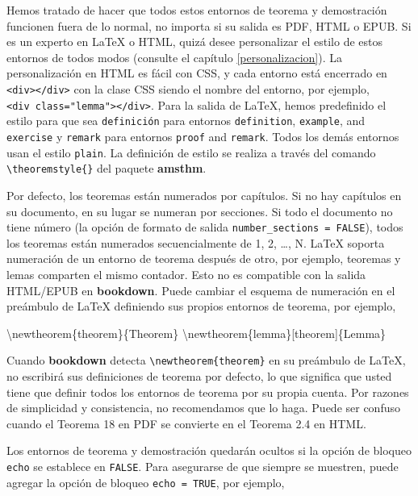 \documentclass[12pt,]{krantz}
\makeatletter
\newenvironment{Shaded}{\begin{snugshade}}{\end{snugshade}}
\newcommand{\FunctionTok}[1]{\textcolor[rgb]{0.00,0.00,0.00}{#1}}
\newcommand{\NormalTok}[1]{#1}
\newenvironment{kframe}{%
\medskip{}
\setlength{\fboxsep}{.8em}
 \def\at@end@of@kframe{}%
 \ifinner\ifhmode%
  \def\at@end@of@kframe{\end{minipage}}%
  \begin{minipage}{\columnwidth}%
 \fi\fi%
 \def\FrameCommand##1{\hskip\@totalleftmargin \hskip-\fboxsep
 \colorbox{shadecolor}{##1}\hskip-\fboxsep
     \hskip-\linewidth \hskip-\@totalleftmargin \hskip\columnwidth}%
 \MakeFramed {\advance\hsize-\width
   \@totalleftmargin\z@ \linewidth\hsize
   \@setminipage}}%
 {\par\unskip\endMakeFramed%
 \at@end@of@kframe}
\renewenvironment{Shaded}{\begin{kframe}}{\end{kframe}}
\theoremstyle{definition}
\theoremstyle{definition}
\theoremstyle{definition}
\theoremstyle{remark}
\makeatother
\begin{document}
Hemos tratado de hacer que todos estos entornos de teorema y
demostración funcionen fuera de lo normal, no importa si su salida es
PDF, HTML o EPUB. Si es un experto en LaTeX o HTML, quizá desee
personalizar el estilo de estos entornos de todos modos (consulte el
capítulo \ref{personalizacion}). La personalización en HTML es fácil con
CSS, y cada entorno está encerrado en
\texttt{\textless{}div\textgreater{}\textless{}/div\textgreater{}} con
la clase CSS siendo el nombre del entorno, por ejemplo,
\texttt{\textless{}div\ class="lemma"\textgreater{}\textless{}/div\textgreater{}}.
Para la salida de LaTeX, hemos predefinido el estilo para que sea
\texttt{definición} para entornos \texttt{definition}, \texttt{example},
and \texttt{exercise} y \texttt{remark} para entornos \texttt{proof} and
\texttt{remark}. Todos los demás entornos usan el estilo \texttt{plain}.
La definición de estilo se realiza a través del comando
\texttt{\textbackslash{}theoremstyle\{\}} del paquete \textbf{amsthm}.

Por defecto, los teoremas están numerados por capítulos. Si no hay
capítulos en su documento, en su lugar se numeran por secciones. Si todo
el documento no tiene número (la opción de formato de salida
\texttt{number\_sections\ =\ FALSE}), todos los teoremas están numerados
secuencialmente de 1, 2, \ldots{}, N. LaTeX soporta numeración de un
entorno de teorema después de otro, por ejemplo, teoremas y lemas
comparten el mismo contador. Esto no es compatible con la salida
HTML/EPUB en \textbf{bookdown}. Puede cambiar el esquema de numeración
en el preámbulo de LaTeX definiendo sus propios entornos de teorema, por
ejemplo,

\begin{Shaded}
\begin{Highlighting}[]
\FunctionTok{\textbackslash{}newtheorem}\NormalTok{\{theorem\}\{Theorem\}}
\FunctionTok{\textbackslash{}newtheorem}\NormalTok{\{lemma\}[theorem]\{Lemma\}}
\end{Highlighting}
\end{Shaded}

Cuando \textbf{bookdown} detecta
\texttt{\textbackslash{}newtheorem\{theorem\}} en su preámbulo de LaTeX,
no escribirá sus definiciones de teorema por defecto, lo que significa
que usted tiene que definir todos los entornos de teorema por su propia
cuenta. Por razones de simplicidad y consistencia, no recomendamos que
lo haga. Puede ser confuso cuando el Teorema 18 en PDF se convierte en
el Teorema 2.4 en HTML.

Los entornos de teorema y demostración quedarán ocultos si la opción de
bloqueo \texttt{echo} se establece en \texttt{FALSE}. Para asegurarse de
que siempre se muestren, puede agregar la opción de bloqueo
\texttt{echo\ =\ TRUE}, por ejemplo,
\end{document}
